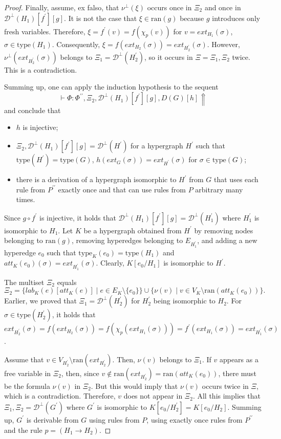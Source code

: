 \documentclass[a4paper,UKenglish,cleveref, autoref, thm-restate,pdfa]{lipics-v2021}
\newcommand{\ran}{\mathrm{ran}}
\newcommand{\lab}{\mathit{lab}}
\newcommand{\att}{\mathit{att}}
\newcommand{\ext}{\mathit{ext}}
\newcommand{\type}{\mathrm{type}}
\newcommand{\diag}{\mathcal{D}}
\begin{document}
\begin{proof}
	Finally, assume, ex falso, that $\nu^\bot(\xi)$ occurs once in $\Xi_2$ and once in $\diag^\bot(H_1)[f^\prime][g]$. It is not the case that $\xi \in \ran(g)$ because $g$ introduces only fresh variables. Therefore, $\xi = f^\prime(v)=f(\chi_p(v))$ for $v = \ext_{H_1}(\sigma)$, $\sigma \in \type(H_1)$. Consequently, $\xi = f(\ext_{H_2}(\sigma))=\ext_{H_2^\prime}(\sigma)$. However, $\nu^\bot(\ext_{H_2^\prime}(\sigma))$ belongs to $\Xi_1 = \diag^\bot(H_2^\prime)$, so it occurs in $\Xi=\Xi_1,\Xi_2$ twice. This is a contradiction.
	
	Summing up, one can apply the induction hypothesis to the sequent 
	$$
	\vdash \Phi : \Phi^{\prime\prime}, \Xi_2, \diag^\bot(H_1)[f^\prime][g], D(G)[h] \Uparrow$$
	and conclude that
	\begin{itemize}
		\item $h$ is injective;
		\item $\Xi_2,\diag^\bot(H_1)[f^\prime][g] = \diag^\bot(H^\prime)$ for a hypergraph $H^\prime$ such that $\type(H^\prime)=\type(G)$, $h(\ext_G(\sigma))=\ext_{H^\prime}(\sigma)$ for $\sigma \in \type(G)$;
		\item there is a derivation of a hypergraph isomorphic to $H^\prime$ from $G$ that uses each rule from $P^{\prime\prime}$ exactly once and that can use rules from $P$ arbitrary many times.
	\end{itemize}
	Since $g \circ f^\prime$ is injective, it holds that $\diag^\bot(H_1)[f^\prime][g]=\diag^\bot(H_1^\prime)$ where $H_1^\prime$ is isomorphic to $H_1$. Let $K$ be a hypergraph obtained from $H^\prime$ by removing nodes belonging to $\ran(g)$, removing hyperedges belonging to $E_{H^\prime_1}$, and adding a new hyperedge $e_0$ such that $\type_K(e_0) = \type(H_1)$ and $\att_K(e_0)(\sigma)=\ext_{H^\prime_1}(\sigma)$. Clearly, $K[e_0/H_1]$ is isomorphic to $H^\prime$. 
	
	The multiset $\Xi_2$ equals
	$$
	\Xi_2 = \{\lab_{K}(e)[\att_K(e)] \mid e \in E_K \setminus \{e_0\}\} \cup \{\nu(v) \mid v \in V_K \setminus \ran(\att_K(e_0))\}.
	$$
	Earlier, we proved that $\Xi_1 = \diag^\bot(H_2^\prime)$ for $H_2^\prime$ being isomorphic to $H_2$. For $\sigma \in \type(H_2^\prime)$, it holds that $\ext_{H_2^\prime}(\sigma) = f(\ext_{H_2}(\sigma)) = f(\chi_p(\ext_{H_1}(\sigma))) = f^\prime(\ext_{H_1}(\sigma)) = \ext_{H_1^\prime}(\sigma)$. 
	
	Assume that $v \in V_{H_2^\prime} \setminus \ran(\ext_{H_2^\prime})$. Then, $\nu(v)$ belongs to $\Xi_1$. If $v$ appears as a free variable in $\Xi_2$, then, since $v\notin\ran(\ext_{H_2^\prime})=\ran(\att_K(e_0))$, there must be the formula $\nu(v)$ in $\Xi_2$. But this would imply that $\nu(v)$ occurs twice in $\Xi$, which is a contradiction. Therefore, $v$ does not appear in $\Xi_2$. All this implies that $\Xi_1,\Xi_2 = \diag^\bot(G^\prime)$ where $G^\prime$ is isomorphic to $K[e_0/H_2^\prime]=K[e_0/H_2]$. Summing up, $G^\prime$ is derivable from $G$ using rules from $P$, using exactly once rules from $P^{\prime\prime}$ and the rule $p=(H_1 \to H_2)$.
	

\end{proof}
\end{document}
